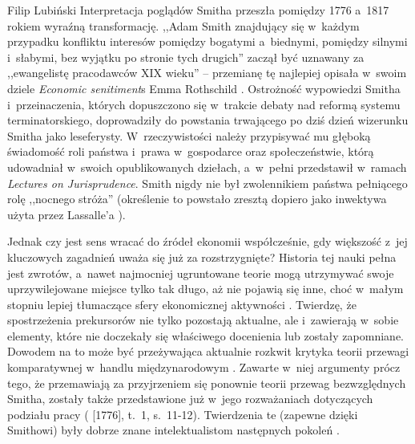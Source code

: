 \begin{artplenv}{Filip Lubiński}
 Interpretacja poglądów Smitha przeszła pomiędzy 1776 a~1817 rokiem wyraźną transformację. ,,Adam Smith znajdujący
się w~każdym przypadku konfliktu interesów pomiędzy bogatymi a~biednymi, pomiędzy silnymi i~słabymi, bez wyjątku po
stronie tych drugich''
\parencite[s.~223]{menger_kleinere_1935}
zaczął być uznawany za ,,ewangelistę pracodawców
XIX wieku'' -- przemianę tę najlepiej opisała w~swoim dziele \textit{Economic senitiment}s Emma Rothschild
\parencite[s.~113]{rothschild_economic_2002}.
Ostrożność wypowiedzi Smitha i~przeinaczenia, których dopuszczono
się w~trakcie debaty nad reformą systemu terminatorskiego, doprowadziły do powstania trwającego po dziś dzień wizerunku
Smitha jako leseferysty. W~rzeczywistości należy przypisywać mu głęboką świadomość roli państwa i~prawa w~gospodarce
oraz społeczeństwie, którą udowadniał w~swoich opublikowanych dziełach, a~w~pełni przedstawił w~ramach \textit{Lectures
on Jurisprudence}. Smith nigdy nie był zwolennikiem państwa pełniącego rolę ,,nocnego stróża'' (określenie to powstało
zresztą dopiero jako inwektywa użyta przez Lassalle'a
\parencite[s.~87]{sawer_ethical_2003}).

Jednak czy jest sens wracać do źródeł ekonomii współcześnie, gdy większość z~jej kluczowych zagadnień uważa się już
za rozstrzygnięte? Historia tej nauki pełna jest zwrotów, a~nawet najmocniej ugruntowane teorie mogą utrzymywać swoje
uprzywilejowane miejsce tylko tak długo, aż nie pojawią się inne, choć w~małym stopniu lepiej tłumaczące sfery
ekonomicznej aktywności
\parencite[s.~33]{blaug_teoria_1994}.
Twierdzę, że spostrzeżenia prekursorów nie tylko
pozostają aktualne, ale i~zawierają w~sobie elementy, które nie doczekały się właściwego docenienia lub zostały
zapomniane. Dowodem na to może być przeżywająca aktualnie rozkwit krytyka teorii przewagi komparatywnej w~handlu
międzynarodowym
\parencite{reinert_how_2008}.
Zawarte w~niej argumenty prócz tego, że przemawiają za
przyjrzeniem się ponownie teorii przewag bezwzględnych Smitha, zostały także przedstawione już w~jego rozważaniach
dotyczących podziału pracy
(\cite{smith_badania_2007} [1776], t.~1, s.~11-12).
Twierdzenia te (zapewne
dzięki Smithowi) były dobrze znane intelektualistom następnych pokoleń
\parencite[s.~343]{tolstoj_anna_1986}.


\end{artplenv}
